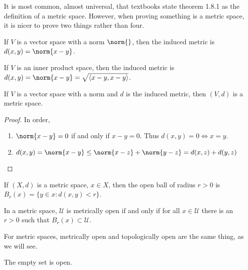 \documentclass[crop=false,class=article,oneside]{standalone}
\begin{document}
            \begin{remark}
            It is most common, almost universal, that textbooks state theorem 1.8.1 as the definition of a metric space. However, when proving something is a metric space, it is nicer to prove two things rather than four.
            \end{remark}
            \begin{definition}
            If $V$ is a vector space with a norm $\norm{}$, then the induced metric is $d(x,y) = \norm{x-y}$.
            \end{definition}
            \begin{remark}
            If $V$ is an inner product space, then the induced metric is $d(x,y) = \norm{x-y} = \sqrt{\langle x-y,x-y\rangle }$.
            \end{remark}
            \begin{theorem}
            If $V$ is a vector space with a norm and $d$ is the induced metric, then $(V,d)$ is a metric space.
            \end{theorem}
            \begin{proof}
            In order,
            \begin{enumerate}
            \item $\norm{x-y} = 0$ if and only if $x-y = 0$. Thus $d(x,y) = 0 \Leftrightarrow x=y$.
            \item $d(x,y) = \norm{x-y}\leq \norm{x-z}+\norm{y-z} = d(x,z)+d(y,z)$
            \end{enumerate}
            \end{proof}
            \begin{definition}
            If $(X,d)$ is a metric space, $x\in X$, then the open ball of radius $r>0$ is $B_{r}(x) = \{y\in x: d(x,y)<r\}$.
            \end{definition}
            \begin{definition}
            In a metric space, $\mathcal{U}$ is metrically open if and only if for all $x\in \mathcal{U}$ there is an $r>0$ such that $B_{r}(x)\subset \mathcal{U}$.
            \end{definition}
            \begin{remark}
            For metric spaces, metrically open and topologically open are the same thing, as we will see.
            \end{remark} 
            \begin{theorem}
            The empty set is open.
            \end{theorem}
\end{document}
